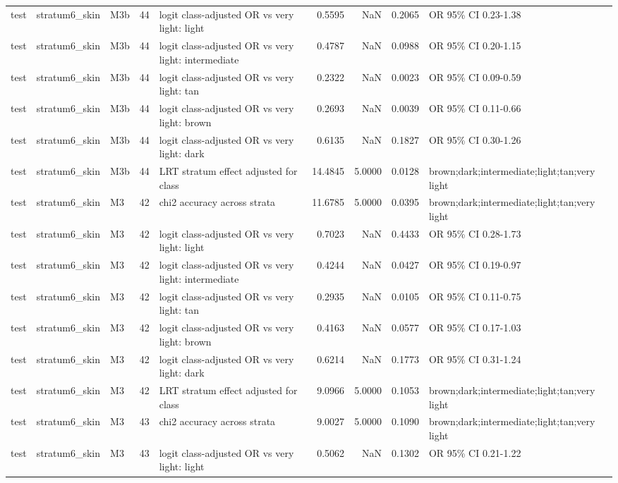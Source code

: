 \begin{tabular}{lllrlrrrl}
test & stratum6\_skin & M3b & 44 & logit class-adjusted OR vs very light: light & 0.5595 & NaN & 0.2065 & OR 95\% CI 0.23-1.38 \\
test & stratum6\_skin & M3b & 44 & logit class-adjusted OR vs very light: intermediate & 0.4787 & NaN & 0.0988 & OR 95\% CI 0.20-1.15 \\
test & stratum6\_skin & M3b & 44 & logit class-adjusted OR vs very light: tan & 0.2322 & NaN & 0.0023 & OR 95\% CI 0.09-0.59 \\
test & stratum6\_skin & M3b & 44 & logit class-adjusted OR vs very light: brown & 0.2693 & NaN & 0.0039 & OR 95\% CI 0.11-0.66 \\
test & stratum6\_skin & M3b & 44 & logit class-adjusted OR vs very light: dark & 0.6135 & NaN & 0.1827 & OR 95\% CI 0.30-1.26 \\
test & stratum6\_skin & M3b & 44 & LRT stratum effect adjusted for class & 14.4845 & 5.0000 & 0.0128 & brown;dark;intermediate;light;tan;very light \\
test & stratum6\_skin & M3 & 42 & chi2 accuracy across strata & 11.6785 & 5.0000 & 0.0395 & brown;dark;intermediate;light;tan;very light \\
test & stratum6\_skin & M3 & 42 & logit class-adjusted OR vs very light: light & 0.7023 & NaN & 0.4433 & OR 95\% CI 0.28-1.73 \\
test & stratum6\_skin & M3 & 42 & logit class-adjusted OR vs very light: intermediate & 0.4244 & NaN & 0.0427 & OR 95\% CI 0.19-0.97 \\
test & stratum6\_skin & M3 & 42 & logit class-adjusted OR vs very light: tan & 0.2935 & NaN & 0.0105 & OR 95\% CI 0.11-0.75 \\
test & stratum6\_skin & M3 & 42 & logit class-adjusted OR vs very light: brown & 0.4163 & NaN & 0.0577 & OR 95\% CI 0.17-1.03 \\
test & stratum6\_skin & M3 & 42 & logit class-adjusted OR vs very light: dark & 0.6214 & NaN & 0.1773 & OR 95\% CI 0.31-1.24 \\
test & stratum6\_skin & M3 & 42 & LRT stratum effect adjusted for class & 9.0966 & 5.0000 & 0.1053 & brown;dark;intermediate;light;tan;very light \\
test & stratum6\_skin & M3 & 43 & chi2 accuracy across strata & 9.0027 & 5.0000 & 0.1090 & brown;dark;intermediate;light;tan;very light \\
test & stratum6\_skin & M3 & 43 & logit class-adjusted OR vs very light: light & 0.5062 & NaN & 0.1302 & OR 95\% CI 0.21-1.22 \\

\end{tabular}
